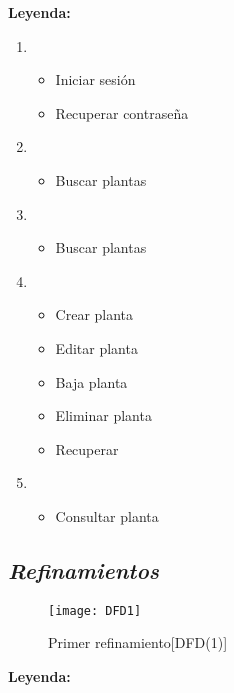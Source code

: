 \documentclass[10pt,a4paper]{article}
\begin{document}
\textbf{Leyenda:}

	\begin{enumerate} [label=\alph*)]
	\item 
		\medskip
		\begin{itemize}[label=-]
			\item Iniciar sesión
			\item Recuperar contraseña		
		\end{itemize}
	\item 
		\medskip
		\begin{itemize}[label=-]
			\item Buscar plantas		
		\end{itemize}

	\item 
		\medskip
		\begin{itemize}[label=-]
			\item Buscar plantas		
		\end{itemize}
		
	\item 
		\medskip
		\begin{itemize}[label=-]
			\item Crear planta
			\item Editar planta
			\item Baja planta
			\item Eliminar planta
			\item Recuperar	
		\end{itemize}
		
	\item
		\medskip
		\begin{itemize}[label=-]
			\item Consultar planta
		\end{itemize}

	\end{enumerate}
\newpage

\subsection{\textbf{\textit{Refinamientos}}}
\begin{wrapfigure}[11]{l}{10cm}
\texttt{[image: DFD1]}
\caption{Primer refinamiento[DFD(1)]}
\end{wrapfigure}


\textbf{Leyenda:}
\end{document}

